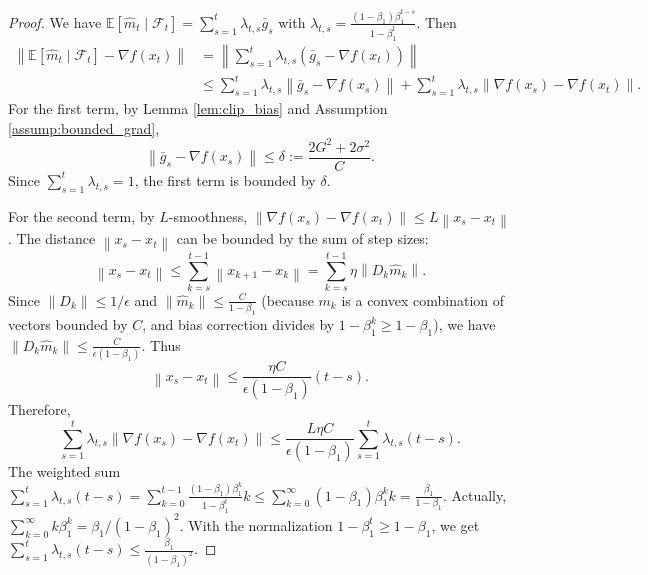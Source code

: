 \documentclass{article}
\newcommand{\E}{\mathbb{E}}
\newcommand{\norm}[1]{\left\| #1 \right\|}
\begin{document}
\begin{proof}
    We have $\E[\hat{m}_t \mid \mathcal{F}_t] = \sum_{s=1}^t \lambda_{t,s} \bar{g}_s$ with $\lambda_{t,s} = \frac{(1-\beta_1)\beta_1^{t-s}}{1-\beta_1^t}$. Then
    \begin{align*}
        \norm{\E[\hat{m}_t \mid \mathcal{F}_t] - \nabla f(x_t)}
        &= \norm{\sum_{s=1}^t \lambda_{t,s} (\bar{g}_s - \nabla f(x_t))} \\
        &\le \sum_{s=1}^t \lambda_{t,s} \norm{\bar{g}_s - \nabla f(x_s)} + \sum_{s=1}^t \lambda_{t,s} \norm{\nabla f(x_s) - \nabla f(x_t)}.
    \end{align*}
    For the first term, by Lemma \ref{lem:clip_bias} and Assumption \ref{assump:bounded_grad},
    \[
        \norm{\bar{g}_s - \nabla f(x_s)} \le \delta := \frac{2G^2 + 2\sigma^2}{C}.
    \]
    Since $\sum_{s=1}^t \lambda_{t,s} = 1$, the first term is bounded by $\delta$.

    For the second term, by $L$-smoothness, $\norm{\nabla f(x_s) - \nabla f(x_t)} \le L \norm{x_s - x_t}$. The distance $\norm{x_s - x_t}$ can be bounded by the sum of step sizes:
    \[
        \norm{x_s - x_t} \le \sum_{k=s}^{t-1} \norm{x_{k+1} - x_k} = \sum_{k=s}^{t-1} \eta \norm{D_k \hat{m}_k}.
    \]
    Since $\norm{D_k} \le 1/\epsilon$ and $\norm{\hat{m}_k} \le \frac{C}{1-\beta_1}$ (because $m_k$ is a convex combination of vectors bounded by $C$, and bias correction divides by $1-\beta_1^k \ge 1-\beta_1$), we have $\norm{D_k \hat{m}_k} \le \frac{C}{\epsilon(1-\beta_1)}$. Thus
    \[
        \norm{x_s - x_t} \le \frac{\eta C}{\epsilon(1-\beta_1)} (t-s).
    \]
    Therefore,
    \[
        \sum_{s=1}^t \lambda_{t,s} \norm{\nabla f(x_s) - \nabla f(x_t)} \le \frac{L \eta C}{\epsilon(1-\beta_1)} \sum_{s=1}^t \lambda_{t,s} (t-s).
    \]
    The weighted sum $\sum_{s=1}^t \lambda_{t,s} (t-s) = \sum_{k=0}^{t-1} \frac{(1-\beta_1)\beta_1^k}{1-\beta_1^t} k \le \sum_{k=0}^\infty (1-\beta_1)\beta_1^k k = \frac{\beta_1}{1-\beta_1}$.
    Actually, $\sum_{k=0}^\infty k \beta_1^k = \beta_1/(1-\beta_1)^2$. With the normalization $1-\beta_1^t \ge 1-\beta_1$, we get $\sum_{s=1}^t \lambda_{t,s} (t-s) \le \frac{\beta_1}{(1-\beta_1)^2}$.


\end{proof}
\end{document}
